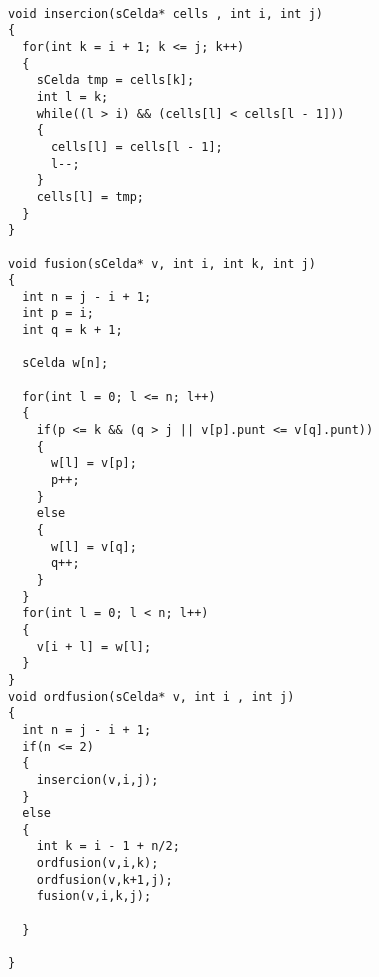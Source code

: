 \begin{lstlisting}

void insercion(sCelda* cells , int i, int j)
{
  for(int k = i + 1; k <= j; k++)
  {
    sCelda tmp = cells[k];
    int l = k;
    while((l > i) && (cells[l] < cells[l - 1]))
    {
      cells[l] = cells[l - 1];
      l--;
    }
    cells[l] = tmp;
  }
}

void fusion(sCelda* v, int i, int k, int j)
{
  int n = j - i + 1;
  int p = i;
  int q = k + 1;
  
  sCelda w[n];
  
  for(int l = 0; l <= n; l++)
  {
    if(p <= k && (q > j || v[p].punt <= v[q].punt))
    { 
      w[l] = v[p];
      p++;
    }
    else
    {
      w[l] = v[q];
      q++;
    }
  }
  for(int l = 0; l < n; l++)
  {
    v[i + l] = w[l];
  }
}
void ordfusion(sCelda* v, int i , int j)
{
  int n = j - i + 1;
  if(n <= 2)
  {
    insercion(v,i,j);
  }
  else
  {
    int k = i - 1 + n/2;
    ordfusion(v,i,k);
    ordfusion(v,k+1,j);
    fusion(v,i,k,j);
    
  }
  
}
\end{lstlisting}
